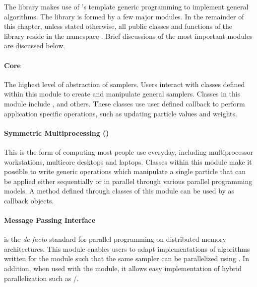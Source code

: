 The \vsmc library makes use of \cpp's template generic programming to implement general \smc algorithms. The library is formed by a few major modules. In the remainder of this chapter, unless stated otherwise, all public classes and functions of the library reside in the namespace . Brief discussions of the most important modules are discussed below.

\paragraph{Core}

The highest level of abstraction of \smc samplers. Users interact with classes defined within this module to create and manipulate general \smc samplers. Classes in this module include ,  and others. These classes use user defined callback to perform application specific operations, such as updating particle values and weights.

\paragraph{Symmetric Multiprocessing (\smp)}

This is the form of computing most people use everyday, including multiprocessor workstations, multicore desktops and laptops. Classes within this module make it possible to write generic operations which manipulate a single particle that can be applied either sequentially or in parallel through various parallel programming models. A method defined through classes of this module can be used by  as callback objects.

\paragraph{Message Passing Interface}

\mpi is the \emph{de facto} standard for parallel programming on distributed memory architectures. This module enables users to adapt implementations of algorithms written for the \smp module such that the same sampler can be parallelized using \mpi. In addition, when used with the \smp module, it allows easy implementation of hybrid parallelization such as \mpi/\openmp.

\paragraph{\opencl}

